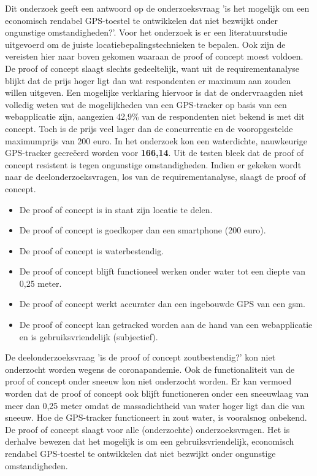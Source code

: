 Dit onderzoek geeft een antwoord op de onderzoeksvraag 'is het mogelijk om een economisch rendabel GPS-toestel te ontwikkelen dat niet bezwijkt onder ongunstige omstandigheden?'.
\newline
\newline
Voor het onderzoek is er een literatuurstudie uitgevoerd om de juiste locatiebepalingstechnieken te bepalen. Ook zijn de vereisten hier naar boven gekomen waaraan de proof of concept moest voldoen. 
\newline
\newline
De proof of concept slaagt slechts gedeeltelijk, want uit de requirementanalyse blijkt dat de prijs hoger ligt dan wat respondenten er maximum aan zouden willen uitgeven. Een mogelijke verklaring hiervoor is dat de ondervraagden niet volledig weten wat de mogelijkheden van een GPS-tracker op basis van een webapplicatie zijn, aangezien 42,9\% van de respondenten niet bekend is met dit concept. Toch is de prijs veel lager dan de concurrentie en de vooropgestelde maximumprijs van 200 euro. In het onderzoek kon een waterdichte, nauwkeurige GPS-tracker gecreëerd worden voor \textbf{166,14}. Uit de testen bleek dat de proof of concept resistent is tegen ongunstige omstandigheden. 
\newline
\newline
Indien er gekeken wordt naar de deelonderzoeksvragen, los van de requirementanalyse, slaagt de proof of concept.
\begin{itemize}
	\item De proof of concept is in staat zijn locatie te delen.
	\item De proof of concept is goedkoper dan een smartphone (200 euro).
	\item De proof of concept is waterbestendig.
	\item De proof of concept blijft functioneel werken onder water tot een diepte van 0,25 meter.
	\item De proof of concept werkt accurater dan een ingebouwde GPS van een gsm.
	\item De proof of concept kan getracked worden aan de hand van een webapplicatie en is gebruiksvriendelijk (subjectief).
\end{itemize}
De deelonderzoeksvraag 'is de proof of concept zoutbestendig?' kon niet onderzocht worden wegens de coronapandemie. Ook de functionaliteit van de proof of concept onder sneeuw kon niet onderzocht worden. Er kan vermoed worden dat de proof of concept ook blijft functioneren onder een sneeuwlaag van meer dan 0,25 meter omdat de massadichtheid van water hoger ligt dan die van sneeuw. Hoe de GPS-tracker functioneert in zout water, is vooralsnog onbekend.
\newline
De proof of concept slaagt voor alle (onderzochte) onderzoeksvragen. Het is derhalve bewezen dat het mogelijk is om een gebruiksvriendelijk, economisch rendabel GPS-toestel te ontwikkelen dat niet bezwijkt onder ongunstige omstandigheden.